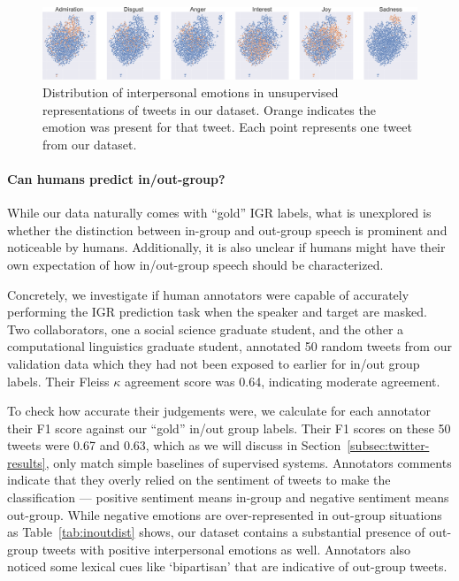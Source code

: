 \begin{figure}[t]
    \centering
    \includegraphics[width=\linewidth]{figures/bt_emots.png}
    \caption{Distribution of interpersonal emotions in unsupervised representations of tweets in our dataset. Orange indicates the emotion was present for that tweet. Each point represents one tweet from our dataset.}
    \label{fig:domainclus}
\end{figure}

\paragraph{Can humans predict in/out-group?}

While our data naturally comes with ``gold'' IGR labels, what is unexplored is whether the distinction between in-group and out-group speech is prominent and noticeable by humans. Additionally, it is also unclear if humans might have their own expectation of how in/out-group speech should be characterized.

Concretely, we investigate if human annotators were capable of accurately performing the IGR prediction task when the speaker and target are masked. Two collaborators, one a social science graduate student, and the other a computational linguistics graduate student, annotated 50 random tweets from our validation data which they had not been exposed to earlier for in/out group labels. Their Fleiss $\kappa$ agreement score was 0.64, indicating moderate agreement.

To check how accurate their judgements were, we calculate for each annotator their F1 score against our ``gold'' in/out group labels. Their F1 scores on these 50 tweets were 0.67 and 0.63, which as we will discuss in Section~\ref{subsec:twitter-results}, only match simple baselines of supervised systems. Annotators comments indicate that they overly relied on the sentiment of tweets to make the classification --- positive sentiment means in-group and negative sentiment means out-group. While negative emotions are over-represented in out-group situations as Table~\ref{tab:inoutdist} shows, our dataset contains a substantial presence of out-group tweets with positive interpersonal emotions as well. Annotators also noticed some lexical cues like `bipartisan' that are indicative of out-group tweets.


